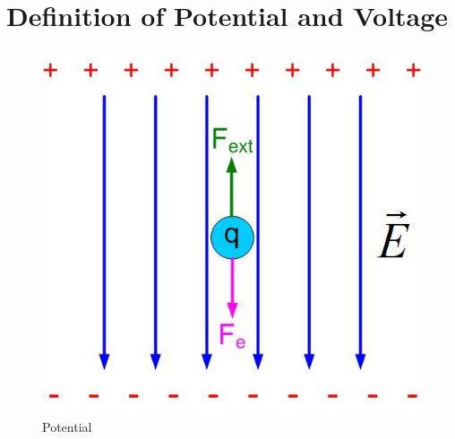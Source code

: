 \documentclass{ximera}
\begin{document}
\section{Definition of Potential and Voltage}



\begin{figure}[htbp]
\begin{center}
\includegraphics[scale=0.5]{../jpg/potential.jpg}
\end{center}
\caption{Potential}
\label{Potential}
\end{figure}
\end{document}
